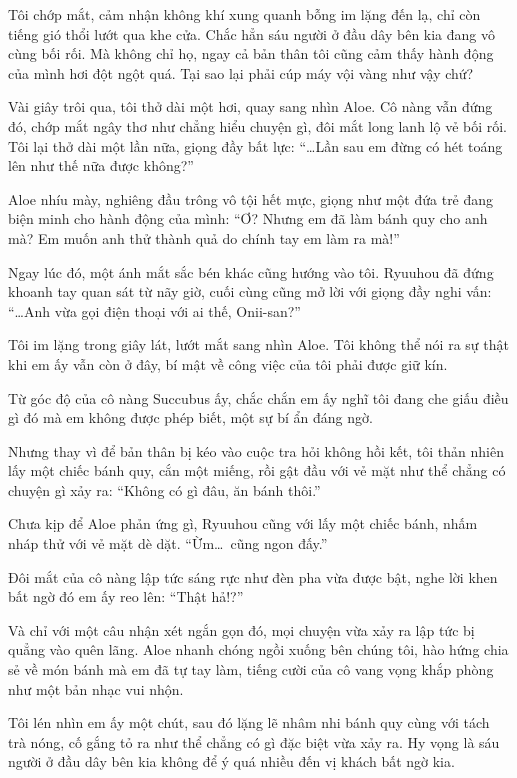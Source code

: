 \documentclass[../main.tex]{subfiles}
\begin{document}
Tôi chớp mắt, cảm nhận không khí xung quanh bỗng im lặng đến lạ, chỉ còn tiếng gió thổi lướt qua khe cửa. Chắc hẳn sáu người ở đầu dây bên kia đang vô cùng bối rối. Mà không chỉ họ, ngay cả bản thân tôi cũng cảm thấy hành động của mình hơi đột ngột quá. Tại sao lại phải cúp máy vội vàng như vậy chứ?

Vài giây trôi qua, tôi thở dài một hơi, quay sang nhìn Aloe. Cô nàng vẫn đứng đó, chớp mắt ngây thơ như chẳng hiểu chuyện gì, đôi mắt long lanh lộ vẻ bối rối. Tôi lại thở dài một lần nữa, giọng đầy bất lực: ``\dots Lần sau em đừng có hét toáng lên như thế nữa được không?''

Aloe nhíu mày, nghiêng đầu trông vô tội hết mực, giọng như một đứa trẻ đang biện minh cho hành động của mình: ``Ơ? Nhưng em đã làm bánh quy cho anh mà? Em muốn anh thử thành quả do chính tay em làm ra mà!''

Ngay lúc đó, một ánh mắt sắc bén khác cũng hướng vào tôi. Ryuuhou đã đứng khoanh tay quan sát từ nãy giờ, cuối cùng cũng mở lời với giọng đầy nghi vấn: ``\dots Anh vừa gọi điện thoại với ai thế, Onii-san?''

Tôi im lặng trong giây lát, lướt mắt sang nhìn Aloe. Tôi không thể nói ra sự thật khi em ấy vẫn còn ở đây, bí mật về công việc của tôi phải được giữ kín.

Từ góc độ của cô nàng Succubus ấy, chắc chắn em ấy nghĩ tôi đang che giấu điều gì đó mà em không được phép biết, một sự bí ẩn đáng ngờ.

Nhưng thay vì để bản thân bị kéo vào cuộc tra hỏi không hồi kết, tôi thản nhiên lấy một chiếc bánh quy, cắn một miếng, rồi gật đầu với vẻ mặt như thể chẳng có chuyện gì xảy ra: ``Không có gì đâu, ăn bánh thôi.''

Chưa kịp để Aloe phản ứng gì, Ryuuhou cũng với lấy một chiếc bánh, nhấm nháp thử với vẻ mặt dè dặt. ``Ừm\dots\ cũng ngon đấy.''

Đôi mắt của cô nàng lập tức sáng rực như đèn pha vừa được bật, nghe lời khen bất ngờ đó em ấy reo lên: ``Thật hả!?''

Và chỉ với một câu nhận xét ngắn gọn đó, mọi chuyện vừa xảy ra lập tức bị quẳng vào quên lãng. Aloe nhanh chóng ngồi xuống bên chúng tôi, hào hứng chia sẻ về món bánh mà em đã tự tay làm, tiếng cười của cô vang vọng khắp phòng như một bản nhạc vui nhộn.

Tôi lén nhìn em ấy một chút, sau đó lặng lẽ nhâm nhi bánh quy cùng với tách trà nóng, cố gắng tỏ ra như thể chẳng có gì đặc biệt vừa xảy ra. Hy vọng là sáu người ở đầu dây bên kia không để ý quá nhiều đến vị khách bất ngờ kia.
\end{document}
